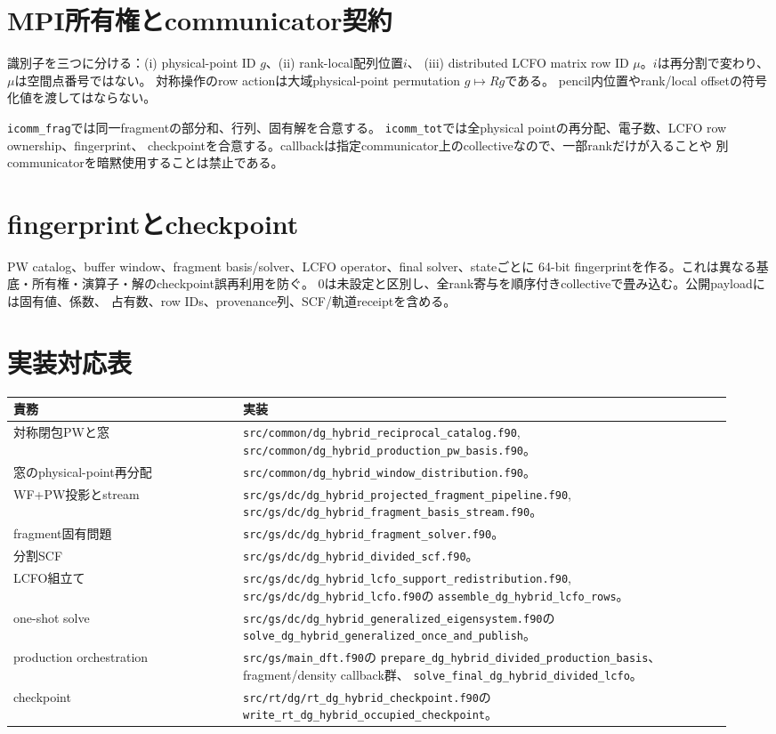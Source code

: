 \documentclass[11pt,a4paper]{article}
\newcommand{\code}[1]{\texttt{#1}}
\begin{document}
\section{MPI所有権とcommunicator契約}
識別子を三つに分ける：(i) physical-point ID $g$、(ii) rank-local配列位置$i$、
(iii) distributed LCFO matrix row ID $\mu$。$i$は再分割で変わり、$\mu$は空間点番号ではない。
対称操作のrow actionは大域physical-point permutation $g\mapsto Rg$である。
pencil内位置やrank/local offsetの符号化値を渡してはならない。

\code{icomm\_frag}では同一fragmentの部分和、行列、固有解を合意する。
\code{icomm\_tot}では全physical pointの再分配、電子数、LCFO row ownership、fingerprint、
checkpointを合意する。callbackは指定communicator上のcollectiveなので、一部rankだけが入ることや
別communicatorを暗黙使用することは禁止である。

\section{fingerprintとcheckpoint}
PW catalog、buffer window、fragment basis/solver、LCFO operator、final solver、stateごとに
64-bit fingerprintを作る。これは異なる基底・所有権・演算子・解のcheckpoint誤再利用を防ぐ。
0は未設定と区別し、全rank寄与を順序付きcollectiveで畳み込む。公開payloadには固有値、係数、
占有数、row IDs、provenance列、SCF/軌道receiptを含める。

\section{実装対応表}
\begin{longtable}{@{}p{0.30\linewidth}p{0.64\linewidth}@{}}
\toprule 責務 & 実装 \\ \midrule
対称閉包PWと窓 & \code{src/common/dg\_hybrid\_reciprocal\_catalog.f90},
\code{src/common/dg\_hybrid\_production\_pw\_basis.f90}。\\
窓のphysical-point再分配 & \code{src/common/dg\_hybrid\_window\_distribution.f90}。\\
WF+PW投影とstream & \code{src/gs/dc/dg\_hybrid\_projected\_fragment\_pipeline.f90},
\code{src/gs/dc/dg\_hybrid\_fragment\_basis\_stream.f90}。\\
fragment固有問題 & \code{src/gs/dc/dg\_hybrid\_fragment\_solver.f90}。\\
分割SCF & \code{src/gs/dc/dg\_hybrid\_divided\_scf.f90}。\\
LCFO組立て & \code{src/gs/dc/dg\_hybrid\_lcfo\_support\_redistribution.f90},
\code{src/gs/dc/dg\_hybrid\_lcfo.f90}の
\code{assemble\_dg\_hybrid\_lcfo\_rows}。\\
one-shot solve & \code{src/gs/dc/dg\_hybrid\_generalized\_eigensystem.f90}の
\code{solve\_dg\_hybrid\_generalized\_once\_and\_publish}。\\
production orchestration & \code{src/gs/main\_dft.f90}の
\code{prepare\_dg\_hybrid\_divided\_production\_basis}、fragment/density callback群、
\code{solve\_final\_dg\_hybrid\_divided\_lcfo}。\\
checkpoint & \code{src/rt/dg/rt\_dg\_hybrid\_checkpoint.f90}の
\code{write\_rt\_dg\_hybrid\_occupied\_checkpoint}。\\
\bottomrule
\end{longtable}
\end{document}
